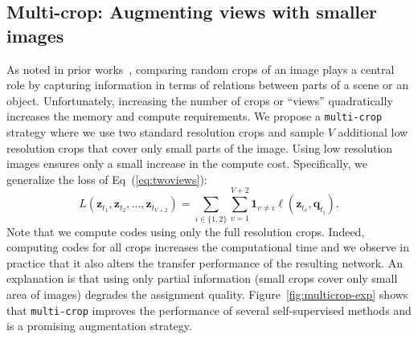\subsection{Multi-crop: Augmenting views with smaller images}
\label{sec:multicrop}
As noted in prior works~\cite{chen2020simple,misra2019self}, comparing random crops of an image plays a central role by capturing information in terms of relations between parts of a scene or an object. 
Unfortunately, increasing the number of crops or ``views'' quadratically increases the memory and compute requirements. 
We propose a \texttt{multi-crop} strategy where we use two standard resolution crops and sample $V$ additional low resolution crops that cover only small parts of the image. 
Using low resolution images ensures only a small increase in the compute cost. 
Specifically, we generalize the loss of Eq~(\ref{eq:twoviews}):
\begin{equation}
L(\mathbf{z}_{t_1}, \mathbf{z}_{t_2}, \dots, \mathbf{z}_{t_{V + 2}}) = \sum_{i \in \{1, 2\}} \sum_{v=1}^{V + 2} \mathbf{1}_{v \neq i} \ell(\mathbf{z}_{t_v}, \mathbf{q}_{t_i}).
\end{equation}
Note that we compute codes using only the full resolution crops.
Indeed, computing codes for all crops increases the computational time and we observe in practice that it also alters the transfer performance of the resulting network.
An explanation is that using only partial information (small crops cover only small area of images) degrades the assignment quality.
Figure~\ref{fig:multicrop-exp} shows that \texttt{multi-crop} improves the performance of several self-supervised methods and is a promising augmentation strategy.

